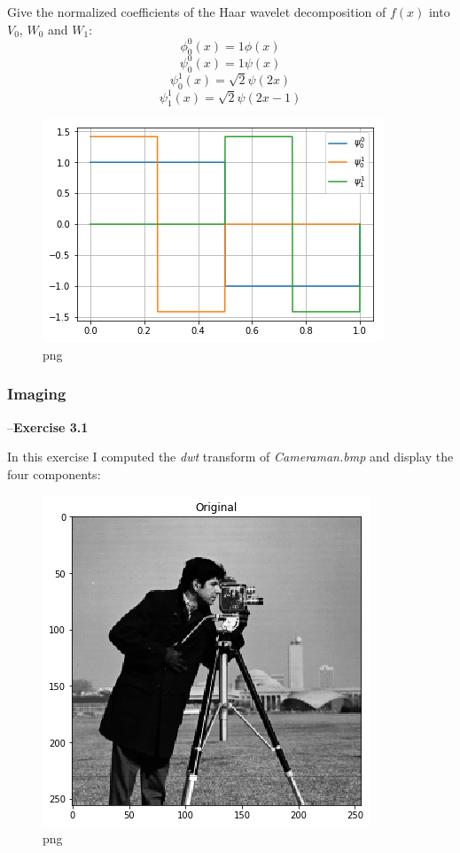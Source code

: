 \documentclass{letter}
\newcommand{\paragraph}[1]{\smallskip--\noindent\textbf{#1}}
\newcommand{\tmem}[1]{{\em #1\/}}
\begin{document}
Give the normalized coefficients of the Haar wavelet decomposition of $f (x)$
into $V_0$, $W_0$ and $W_1$:
\[ \phi^0_0 (x) = 1 \phi (x) \]
\[ \psi^0_0 (x) = 1 \psi (x) \]
\[ \psi^1_0 (x) = \sqrt{2} \psi (2 x) \]
\[ \psi^1_1 (x) = \sqrt{2} \psi (2 x - 1) \]
\begin{figure}[h]
  \begin{center}
    \includegraphics{output_9_0.png} 
  \end{center}
  \caption{png}
\end{figure}

\subsubsection{Imaging}\label{imaging}

\paragraph{Exercise 3.1}\label{exercise-3.1}

In this exercise I computed the {\tmem{dwt}} transform of
{\tmem{Cameraman.bmp}} and display the four components:

\begin{figure}[h]
  \begin{center}
    \includegraphics{output_11_0.png} 
  \end{center}
  \caption{png}
\end{figure}
\end{document}
